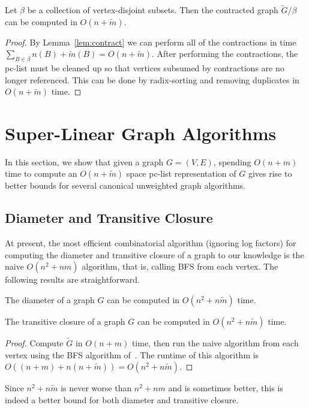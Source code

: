 \documentclass{llncs}
\begin{document}
\begin{lemma}\label{lem:contractG}
Let $\beta$ be a collection of vertex-disjoint subsets. Then the contracted graph $\widetilde{G}/\beta$ can be computed in $O(n+\widetilde{m})$.
\end{lemma}
\begin{proof}
By Lemma~\ref{lem:contract} we can perform all of the contractions in time $\sum_{B\in\beta} n(B) + \widetilde{m}(B) = O(n + \widetilde{m})$.  After performing the contractions, the pc-list must be cleaned up so that vertices subsumed by contractions are no longer referenced.  This can be done by radix-sorting and removing duplicates in $O(n + \widetilde{m})$ time.
\end{proof}


\section{Super-Linear Graph Algorithms}
In this section, we show that given a graph $G = (V,E)$, spending $O(n+m)$ time to compute an $O(n+\widetilde{m})$ space pc-list representation of $G$ gives rise to better bounds for several canonical unweighted graph algorithms.  

\subsection{Diameter and Transitive Closure}

At present, the most efficient combinatorial algorithm (ignoring log factors) for computing the diameter and transitive closure of a graph to our knowledge is the naive $O(n^2 + nm)$ algorithm, that is, calling BFS from each vertex.  The following results are straightforward.
\begin{theorem}
The diameter of a graph $G$ can be computed in $O(n^2+ n\widetilde{m})$ time.
\end{theorem}
\begin{theorem}
The transitive closure of a graph $G$ can be computed in $O(n^2+ n\widetilde{m})$ time.
\end{theorem}
\begin{proof}
Compute $\widetilde{G}$ in $O(n+m)$ time,  then run the naive algorithm from each vertex using the BFS algorithm of~\cite{DahlhausGM02}.  The runtime of this algorithm is $O((n+m) + n(n+\widetilde{m})) = O(n^2 + n\widetilde{m})$.
\end{proof}
\noindent Since $n^2+n\widetilde{m}$ is never worse than $n^2+nm$ and is sometimes better, this is indeed a better bound for both diameter and transitive closure.  
\end{document}
